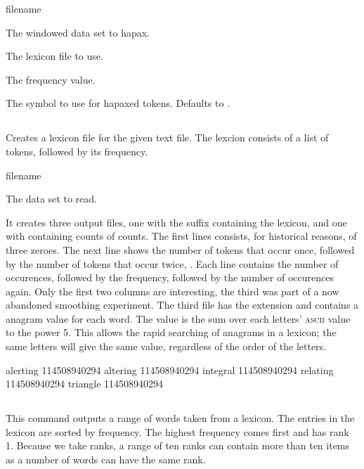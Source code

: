 \documentclass[a4paper,10pt,twoside]{report}
\begin{document}
\begin{varlist}{filename}
\item[filename] The windowed data set to hapax.
\item[lexicon] The lexicon file to use.
\item[hpx] The frequency value.
\item[hpx\_sym] The symbol to use for hapaxed tokens. Defaults to
  . 
\end{varlist}

\subsection{}

Creates a lexicon file for the given text file. The lexcion consists
of a list of tokens, followed by its frequency.

\begin{varlist}{filename}
\item[filename] The data set to read.
\end{varlist}

It creates three output files, one with the suffix 
containing the lexicon, and one with  containing counts of
counts. The first lines consists, for historical reasons, of three 
zeroes. The next line shows the number of tokens that occur once,
followed by the number of tokens that occur twice, \etc{}. Each line
contains the number of occurences, followed by the frequency, followed
by the number of occurences again. Only the first two columns are
interesting, the third was part of a now abandoned smoothing experiment.
The third file has the extension  and contains a
anagram value for each word. The value is the sum over each letters'
\textsc{ascii} value to the power 5. This allows the rapid searching
of anagrams in a lexicon; the same letters will give the same value,
regardless of the order of the letters.

\begin{wout}{}
alerting 114508940294
altering 114508940294
integral 114508940294
relating 114508940294
triangle 114508940294
\end{wout}

\subsection{}

This command outputs a range of words taken from a lexicon. The
entries in the lexicon are sorted by frequency. The highest frequency
comes first and has rank 1.  Because we take ranks, a range of ten
ranks can contain more than ten items as a number of words can have
the same rank.
\end{document}
